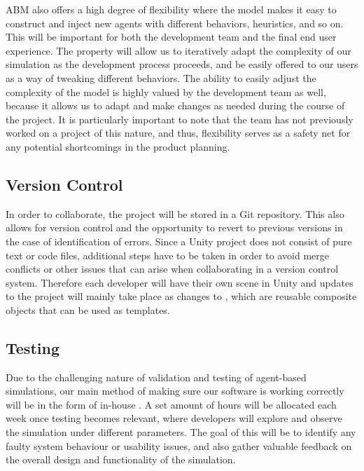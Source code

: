     ABM also offers a high degree of flexibility where the model makes it easy to construct and inject new agents with different behaviors, heuristics, and so on. This will be important for both the development team and the final end user experience. The property will allow us to iteratively adapt the complexity of our simulation as the development process proceeds, and be easily offered to our users as a way of tweaking different behaviors. The ability to easily adjust the complexity of the model is highly valued by the development team as well, because it allows us to adapt and make changes as needed during the course of the project. It is particularly important to note that the team has not previously worked on a project of this nature, and thus, flexibility serves as a safety net for any potential shortcomings in the product planning.

\subsection{Version Control}
In order to collaborate, the project will be stored in a Git repository. This also allows for version control and the opportunity to revert to previous versions in the case of identification of errors. Since a Unity project does not consist of pure text or code files, additional steps have to be taken in order to avoid merge conflicts or other issues that can arise when collaborating in a version control system. Therefore each developer will have their own scene in Unity and updates to the project will mainly take place as changes to , which are reusable composite objects that can be used as templates.

\subsection{Testing}
    Due to the challenging nature of validation and testing of agent-based simulations, our main method of making sure our software is working correctly will be in the form of in-house . A set amount of hours will be allocated each week once testing becomes relevant, where developers will explore and observe the simulation under different parameters. The goal of this will be to identify any faulty system behaviour or usability issues, and also gather valuable feedback on the overall design and functionality of the simulation.

